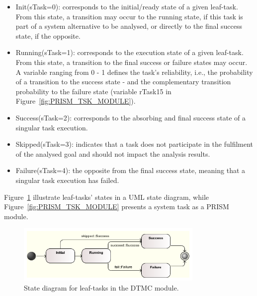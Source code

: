 \begin{itemize}

\item Init(sTask=0): corresponds to the initial/ready state of a given leaf-task. From this state, a transition may occur to the running state, if this task is part of a system alternative to be analysed, or directly to the final success state, if the opposite.
\medskip

\item Running(sTask=1): corresponds to the execution state of a given leaf-task. From this state, a transition to the final success or failure states may occur. A variable ranging from 0 - 1 defines the task's reliability, i.e., the probability of a transition to the success state - and the complementary transition probability to the failure state (variable rTask15 in Figure~\ref{fig:PRISM_TSK_MODULE}).
\medskip

\item Success(sTask=2): corresponds to the absorbing and final success state of a singular task execution.
\medskip

\item Skipped(sTask=3): indicates that a task does not participate in the fulfilment of the analysed goal and should not impact the analysis results.
\medskip

\item Failure(sTask=4): the opposite from the final success state, meaning that a singular task execution has failed.

\end{itemize}

Figure~\ref{fig:UML_TSK_STATES} illustrate leaf-tasks' states in a UML state diagram, while Figure~\ref{fig:PRISM_TSK_MODULE} presents a system task as a PRISM module.

\begin{figure}[ht]
\centering
\includegraphics[width=0.8\textwidth]{imgs/UML_TSK_STATES.png}
\caption{State diagram for leaf-tasks in the DTMC module.}
\label{fig:UML_TSK_STATES}
\end{figure}


